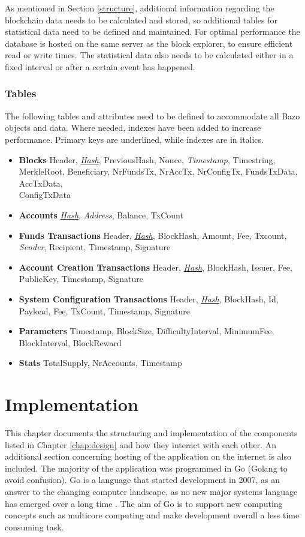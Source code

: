 As mentioned in Section \ref{structure}, additional information regarding the blockchain data needs to be calculated and stored, so additional tables for statistical data need to be defined and maintained. For optimal performance the database is hosted on the same server as the block explorer, to ensure efficient read or write times. The statistical data also needs to be calculated either in a fixed interval or after a certain event has happened.

\subsection{Tables}
The following tables and attributes need to be defined to accommodate all Bazo objects and data. Where needed, indexes have been added to increase performance. Primary keys are underlined, while indexes are in italics.
\begin{itemize}
\item \textbf{Blocks}
Header, \underline{\textit{Hash}}, PreviousHash, Nonce, \textit{Timestamp}, Timestring, MerkleRoot, Beneficiary, NrFundsTx, NrAccTx, NrConfigTx, FundsTxData, AccTxData,\\ ConfigTxData
\item \textbf{Accounts}
 \underline{\textit{Hash}}, \textit{Address}, Balance, TxCount
\item \textbf{Funds Transactions}
Header, \underline{\textit{Hash}}, BlockHash, Amount, Fee, Txcount, \textit{Sender}, Recipient, Timestamp, Signature
\item \textbf{Account Creation Transactions}
Header, \underline{\textit{Hash}}, BlockHash, Issuer, Fee,\\ PublicKey, Timestamp, Signature
\item \textbf{System Configuration Transactions}
Header, \underline{\textit{Hash}}, BlockHash, Id, Payload, Fee, TxCount, Timestamp, Signature
\item \textbf{Parameters}
Timestamp, BlockSize, DifficultyInterval, MinimumFee,\\ BlockInterval, BlockReward
\item \textbf{Stats}
TotalSupply, NrAccounts, Timestamp
\end{itemize}

\chapter{Implementation}
This chapter documents the structuring and implementation of the components listed in Chapter \ref{chap:design} and how they interact with each other. An additional section concerning hosting of the application on the internet is also included. The majority of the application was programmed in Go (Golang to avoid confusion). Go is a language that started development in 2007, as an answer to the changing computer landscape, as no new major systems language has emerged over a long time \cite{gohistory}. The aim of Go is to support new computing concepts such as multicore computing and make development overall a less time consuming task.

